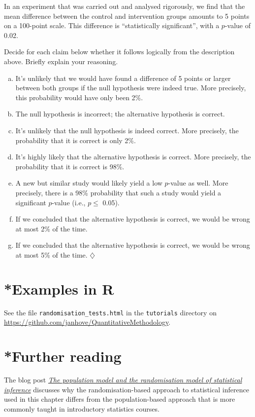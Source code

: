 \documentclass[a4paper]{tufte-book}\usepackage[]{graphicx}\usepackage[]{xcolor}
\newcommand*{\parend}[1][$\diamondsuit$]{%
  \unskip\nobreak\hspace{1em plus 1fill}$\diamondsuit$%
}
\begin{document}
In an experiment that was carried out and analysed rigorously, we find that the mean difference between the control and intervention groups amounts to 5 points on a 100-point scale. This difference is ``statistically significant'', with a $p$-value of 0.02.

Decide for each claim below whether it follows logically from the description
above.
Briefly explain your reasoning.

\begin{enumerate}[(a)]
  \item It's unlikely that we would have found a difference of 5 points or larger between both groups if the null hypothesis were indeed true. More precisely, this probability would have only been 2\%.

  \item The null hypothesis is incorrect; the alternative hypothesis is correct.

   \item It's unlikely that the null hypothesis is indeed correct. More precisely, the probability that it is correct is only 2\%.

  \item It's highly likely that the alternative hypothesis is correct. More precisely, the probability that it is correct is 98\%.

  \item A new but similar study would likely yield a low $p$-value as well.
  More precisely, there is a 98\% probability that such a study would yield
  a significant $p$-value (i.e., $p \leq$ 0.05).

  \item If we concluded that the alternative hypothesis is correct, we would be wrong at most 2\% of the time.

  \item If we concluded that the alternative hypothesis is correct, we would be wrong at most 5\% of the time. \parend
\end{enumerate}

\section{*Examples in R}
See the file \texttt{randomisation\_tests.html}
in the \texttt{tutorials} directory on \url{https://github.com/janhove/QuantitativeMethodology}.

\section{*Further reading}
The blog post 
\href{https://janhove.github.io/posts/2025-11-09-population-randomisation/}{\textit{The population model and the randomisation model of statistical inference}}
discusses why the randomisation-based approach to statistical inference
used in this chapter differs from the population-based approach that is
more commonly taught in introductory statistics courses.
\end{document}
